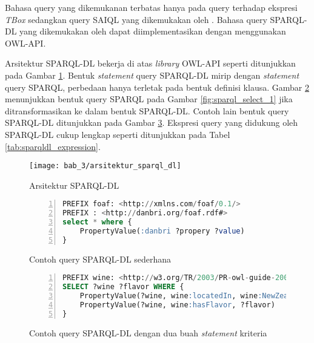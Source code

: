 Bahasa query yang dikemukanan \cite{fikes} terbatas hanya pada query terhadap ekspresi \emph{TBox} sedangkan query SAIQL yang dikemukakan oleh \citet{kubias}. Bahasa query SPARQL-DL yang dikemukakan oleh \cite{evren_sirin} dapat diimplementasikan dengan menggunakan OWL-API. 

Arsitektur SPARQL-DL bekerja di atas \emph{library} OWL-API seperti ditunjukkan pada Gambar \ref{fig:sparqldl_architecture}. Bentuk \emph{statement} query SPARQL-DL mirip dengan \emph{statement} query SPARQL, perbedaan hanya terletak pada bentuk definisi klausa. Gambar \ref{fig:sparqldl_query_1} menunjukkan bentuk query SPARQL pada Gambar \ref{fig:sparql_select_1} jika ditransformasikan ke dalam bentuk SPARQL-DL. Contoh lain bentuk query SPARQL-DL ditunjukkan pada Gambar \ref{fig:sparqldl_query_2}. Ekspresi query yang didukung oleh SPARQL-DL cukup lengkap seperti ditunjukkan pada Tabel \ref{tab:sparqldl_expression}.

\begin{figure}[hb]
	\texttt{[image: bab\_3/arsitektur\_sparql\_dl]}
	\caption{Arsitektur SPARQL-DL}
	\label{fig:sparqldl_architecture}
\end{figure}

\begin{figure}[ht]
	\begin{lstlisting}[language=SQL, numbers=left]
PREFIX foaf: <http://xmlns.com/foaf/0.1/>
PREFIX : <http://danbri.org/foaf.rdf#>
select * where {
	PropertyValue(:danbri ?propery ?value)
}\end{lstlisting}
	\caption{Contoh query SPARQL-DL sederhana}
	\label{fig:sparqldl_query_1}
\end{figure}

\begin{figure}[ht]
	\begin{lstlisting}[language=SQL, numbers=left]
PREFIX wine: <http://w3.org/TR/2003/PR-owl-guide-20031209/wine#>
SELECT ?wine ?flavor WHERE { 
	PropertyValue(?wine, wine:locatedIn, wine:NewZealandRegion), 
	PropertyValue(?wine, wine:hasFlavor, ?flavor)
}\end{lstlisting}
	\caption{Contoh query SPARQL-DL dengan dua buah \emph{statement} kriteria}
	\label{fig:sparqldl_query_2}
\end{figure}

